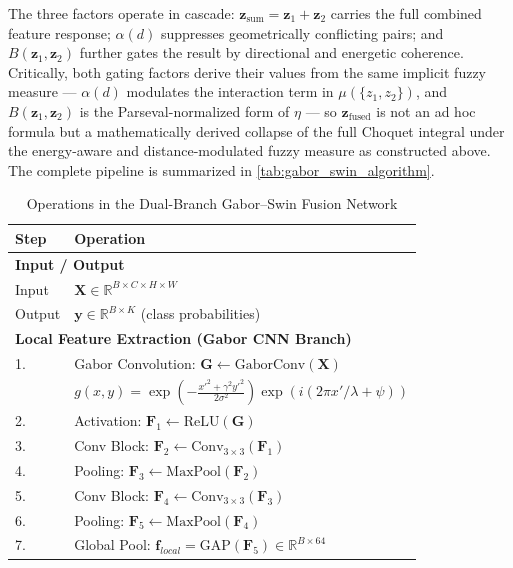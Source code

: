\documentclass[12pt]{article}
\begin{document}
The three factors operate in cascade: $\mathbf{z}_{\text{sum}} = \mathbf{z}_1+\mathbf{z}_2$ carries the full combined feature response; $\alpha(d)$ suppresses geometrically conflicting pairs; and $B(\mathbf{z}_1,\mathbf{z}_2)$ further gates the result by directional and energetic coherence. Critically, both gating factors derive their values from the same implicit fuzzy measure — $\alpha(d)$ modulates the interaction term in $\mu(\{z_1,z_2\})$, and $B(\mathbf{z}_1,\mathbf{z}_2)$ is the Parseval-normalized form of $\eta$ — so $\mathbf{z}_{\text{fused}}$ is not an ad hoc formula but a mathematically derived collapse of the full Choquet integral under the energy-aware and distance-modulated fuzzy measure as constructed above. The complete pipeline is summarized in \autoref{tab:gabor_swin_algorithm}.
\begin{table}[!h]
\centering
\caption{Operations in the Dual-Branch Gabor--Swin Fusion Network}
\label{tab:gabor_swin_algorithm}
\footnotesize
\setlength{\tabcolsep}{3pt}
\renewcommand{\arraystretch}{0.9}

\begin{tabular}{@{}ll@{}}
\toprule
\textbf{Step} & \textbf{Operation} \\
\midrule

\multicolumn{2}{l}{\textbf{Input / Output}} \\
Input & $\mathbf{X} \in \mathbb{R}^{B \times C \times H \times W}$ \\
Output & $\mathbf{y} \in \mathbb{R}^{B \times K}$ (class probabilities) \\

\midrule
\multicolumn{2}{l}{\textbf{Local Feature Extraction (Gabor CNN Branch)}} \\

1. & Gabor Convolution: $\mathbf{G} \leftarrow \text{GaborConv}(\mathbf{X})$ \\
 & \quad $g(x,y)=\exp\!\left(-\frac{x'^2+\gamma^2y'^2}{2\sigma^2}\right)
      \exp\!\left(i(2\pi x'/\lambda+\psi)\right)$ \\

2. & Activation: $\mathbf{F}_1 \leftarrow \text{ReLU}(\mathbf{G})$ \\
3. & Conv Block: $\mathbf{F}_2 \leftarrow \text{Conv}_{3\times3}(\mathbf{F}_1)$ \\
4. & Pooling: $\mathbf{F}_3 \leftarrow \text{MaxPool}(\mathbf{F}_2)$ \\
5. & Conv Block: $\mathbf{F}_4 \leftarrow \text{Conv}_{3\times3}(\mathbf{F}_3)$ \\
6. & Pooling: $\mathbf{F}_5 \leftarrow \text{MaxPool}(\mathbf{F}_4)$ \\
7. & Global Pool: $\mathbf{f}_{local} = \text{GAP}(\mathbf{F}_5) \in \mathbb{R}^{B \times 64}$ \\


\end{tabular}
\end{table}
\end{document}
